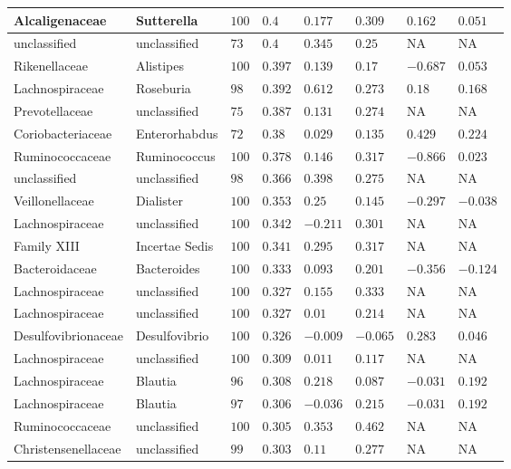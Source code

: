 \begin{table}[!ht]
\begin{tiny}
\begin{tabular}{|l|l|l|l|l|l|l|l|}
Alcaligenaceae & Sutterella & $100$ & $0.4$ & $0.177$ & $0.309$ & $0.162$ & $0.051$ \\ \hline
unclassified & unclassified & $73$ & $0.4$ & $0.345$ & $0.25$ & NA & NA \\ \hline
Rikenellaceae & Alistipes & $100$ & $0.397$ & $0.139$ & $0.17$ & $-0.687$ & $0.053$ \\ \hline
Lachnospiraceae & Roseburia & $98$ & $0.392$ & $0.612$ & $0.273$ & $0.18$ & $0.168$ \\ \hline
Prevotellaceae & unclassified & $75$ & $0.387$ & $0.131$ & $0.274$ & NA & NA \\ \hline
Coriobacteriaceae & Enterorhabdus & $72$ & $0.38$ & $0.029$ & $0.135$ & $0.429$ & $0.224$ \\ \hline
Ruminococcaceae & Ruminococcus & $100$ & $0.378$ & $0.146$ & $0.317$ & $-0.866$ & $0.023$ \\ \hline
unclassified & unclassified & $98$ & $0.366$ & $0.398$ & $0.275$ & NA & NA \\ \hline
Veillonellaceae & Dialister & $100$ & $0.353$ & $0.25$ & $0.145$ & $-0.297$ & $-0.038$ \\ \hline
Lachnospiraceae & unclassified & $100$ & $0.342$ & $-0.211$ & $0.301$ & NA & NA \\ \hline
Family XIII & Incertae Sedis & $100$ & $0.341$ & $0.295$ & $0.317$ & NA & NA \\ \hline
Bacteroidaceae & Bacteroides & $100$ & $0.333$ & $0.093$ & $0.201$ & $-0.356$ & $-0.124$ \\ \hline
Lachnospiraceae & unclassified & $100$ & $0.327$ & $0.155$ & $0.333$ & NA & NA \\ \hline
Lachnospiraceae & unclassified & $100$ & $0.327$ & $0.01$ & $0.214$ & NA & NA \\ \hline
Desulfovibrionaceae & Desulfovibrio & $100$ & $0.326$ & $-0.009$ & $-0.065$ & $0.283$ & $0.046$ \\ \hline
Lachnospiraceae & unclassified & $100$ & $0.309$ & $0.011$ & $0.117$ & NA & NA \\ \hline
Lachnospiraceae & Blautia & $96$ & $0.308$ & $0.218$ & $0.087$ & $-0.031$ & $0.192$ \\ \hline
Lachnospiraceae & Blautia & $97$ & $0.306$ & $-0.036$ & $0.215$ & $-0.031$ & $0.192$ \\ \hline
Ruminococcaceae & unclassified & $100$ & $0.305$ & $0.353$ & $0.462$ & NA & NA \\ \hline
Christensenellaceae & unclassified & $99$ & $0.303$ & $0.11$ & $0.277$ & NA & NA \\ \hline

\end{tabular}
\end{tiny}
\end{table}
